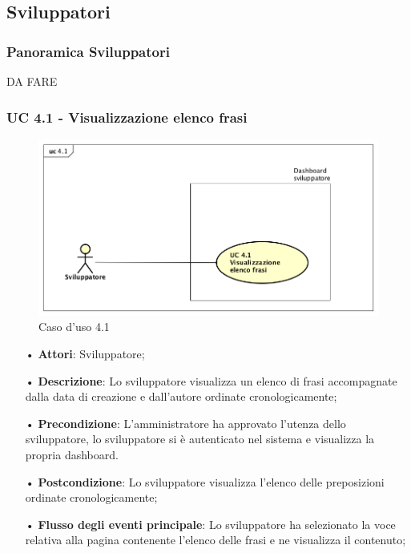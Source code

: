\subsection{Sviluppatori}
\subsubsection{Panoramica Sviluppatori}
DA FARE
\subsubsection{UC 4.1 - Visualizzazione elenco frasi}
\begin{figure}[H]
\centering
\includegraphics[width=17cm]{img/UC410.png} 
\caption{Caso d'uso 4.1}\label{fig:410}
\end{figure}
\begin{itemize}
\item[•]\textbf{Attori}: Sviluppatore;
\item[•]\textbf{Descrizione}: Lo sviluppatore visualizza un elenco di frasi accompagnate dalla data di creazione e dall’autore ordinate cronologicamente;
\item[•]\textbf{Precondizione}:  L'amministratore ha approvato l'utenza dello sviluppatore, lo sviluppatore si è autenticato nel sistema e visualizza la propria dashboard.
\item[•]\textbf{Postcondizione}: Lo sviluppatore visualizza l'elenco delle preposizioni ordinate cronologicamente;
\item[•]\textbf{Flusso degli eventi principale}: Lo sviluppatore ha selezionato la voce relativa alla pagina contenente l’elenco delle frasi e ne visualizza il contenuto; 
\end{itemize}
